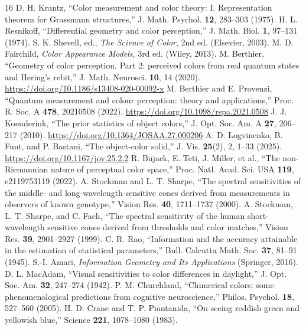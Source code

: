 \documentclass[9pt,twocolumn,twoside]{opticajnl}
\theoremstyle{plain}
\begin{document}
\begin{thebibliography}{16}
 D. H. Krantz, ``Color measurement and color theory: I. Representation theorem for Grassmann structures,'' J. Math. Psychol. \textbf{12}, 283--303 (1975).
 H. L. Resnikoff, ``Differential geometry and color perception,'' J. Math. Biol. \textbf{1}, 97--131 (1974).
 S. K. Shevell, ed., \emph{The Science of Color}, 2nd ed. (Elsevier, 2003).
 M. D. Fairchild, \emph{Color Appearance Models}, 3rd ed. (Wiley, 2013).
 M. Berthier, ``Geometry of color perception. Part 2: perceived colors from real quantum states and Hering's rebit,'' J. Math. Neurosci. \textbf{10}, 14 (2020). \url{https://doi.org/10.1186/s13408-020-00092-x}
 M. Berthier and E. Provenzi, ``Quantum measurement and colour perception: theory and applications,'' Proc. R. Soc. A \textbf{478}, 20210508 (2022). \url{https://doi.org/10.1098/rspa.2021.0508}
 J. J. Koenderink, ``The prior statistics of object colors,'' J. Opt. Soc. Am. A \textbf{27}, 206--217 (2010). \url{https://doi.org/10.1364/JOSAA.27.000206}
 A. D. Logvinenko, B. Funt, and P. Bastani, ``The object-color solid,'' J. Vis. \textbf{25}(2), 2, 1--33 (2025). \url{https://doi.org/10.1167/jov.25.2.2}
 R. Bujack, E. Teti, J. Miller, et al., ``The non-Riemannian nature of perceptual color space,'' Proc. Natl. Acad. Sci. USA \textbf{119}, e2119753119 (2022).
 A. Stockman and L. T. Sharpe, ``The spectral sensitivities of the middle- and long-wavelength-sensitive cones derived from measurements in observers of known genotype,'' Vision Res. \textbf{40}, 1711--1737 (2000).
 A. Stockman, L. T. Sharpe, and C. Fach, ``The spectral sensitivity of the human short-wavelength sensitive cones derived from thresholds and color matches,'' Vision Res. \textbf{39}, 2901--2927 (1999).
 C. R. Rao, ``Information and the accuracy attainable in the estimation of statistical parameters,'' Bull. Calcutta Math. Soc. \textbf{37}, 81--91 (1945).
 S.-I. Amari, \emph{Information Geometry and Its Applications} (Springer, 2016).
 D. L. MacAdam, ``Visual sensitivities to color differences in daylight,'' J. Opt. Soc. Am. \textbf{32}, 247--274 (1942).
 P. M. Churchland, ``Chimerical colors: some phenomenological predictions from cognitive neuroscience,'' Philos. Psychol. \textbf{18}, 527--560 (2005).
 H. D. Crane and T. P. Piantanida, ``On seeing reddish green and yellowish blue,'' Science \textbf{221}, 1078--1080 (1983).
\end{thebibliography}
\end{document}
